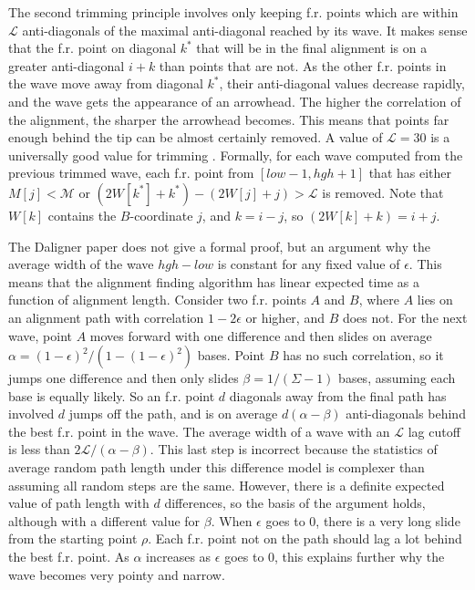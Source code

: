 \documentclass[../main/thesis.tex]{subfiles}
\begin{document}


The second trimming principle involves only keeping f.r. points which are within $\mathcal{L}$ anti-diagonals of the maximal anti-diagonal reached by its wave.
It makes sense that the f.r. point on diagonal $k^*$ that will be in the final alignment is on a greater anti-diagonal $i+k$ than points that are not.
As the other f.r. points in the wave move away from diagonal $k^*$, their anti-diagonal values decrease rapidly, and the wave gets the appearance of an arrowhead.
The higher the correlation of the alignment, the sharper the arrowhead becomes.
This means that points far enough behind the tip can be almost certainly removed.
A value of $\mathcal{L} = 30$ is a universally good value for trimming \cite{daligner}.
Formally, for each wave computed from the previous trimmed wave, each f.r. point from $[low-1,hgh+1]$ that has either $M[j]<\mathcal{M}$ or $(2W[k^*]+k^*) - (2W[j]+j) > \mathcal{L}$ is removed.
Note that $W[k]$ contains the $B$-coordinate $j$, and $k=i-j$, so $(2W[k]+k) = i+j$.

The Daligner paper does not give a formal proof, but an argument why the average width of the wave $hgh-low$ is constant for any fixed value of $\epsilon$.
This means that the alignment finding algorithm has linear expected time as a function of alignment length.
Consider two f.r. points $A$ and $B$, where $A$ lies on an alignment path with correlation $1-2\epsilon$ or higher, and $B$ does not.
For the next wave, point $A$ moves forward with one difference and then slides on average $\alpha = (1-\epsilon)^2/(1-(1-\epsilon)^2)$ bases.
Point $B$ has no such correlation, so it jumps one difference and then only slides $\beta = 1/(\Sigma-1)$ bases, assuming each base is equally likely.
So an f.r. point $d$ diagonals away from the final path has involved $d$ jumps off the path, and is on average $d(\alpha-\beta)$ anti-diagonals behind the best f.r. point in the wave.
The average width of a wave with an $\mathcal{L}$ lag cutoff is less than $2\mathcal{L}/(\alpha-\beta)$.
This last step is incorrect because the statistics of average random path length under this difference model is complexer than assuming all random steps are the same.
However, there is a definite expected value of path length with $d$ differences, so the basis of the argument holds, although with a different value for $\beta$.
When $\epsilon$ goes to 0, there is a very long slide from the starting point $\rho$.
Each f.r. point not on the path should lag a lot behind the best f.r. point.
As $\alpha$ increases as $\epsilon$ goes to 0, this explains further why the wave becomes very pointy and narrow.
\end{document}

